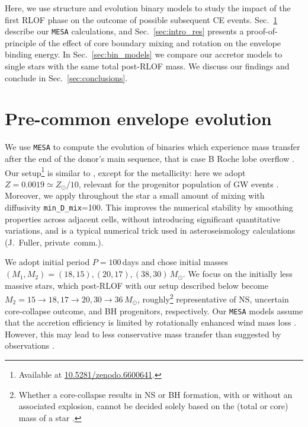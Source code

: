 \documentclass[twocolumn,twocolappendix,trackchanges]{aastex63}
\DeclareRobustCommand{\Secref}[1]{Sec.~\ref{#1}}
\begin{document}
Here, we use structure and evolution binary models to study
the impact of the first RLOF phase on the outcome of possible
subsequent CE events. \Secref{sec:methods} describe our \texttt{MESA}
calculations, and \Secref{sec:intro_res} presents a proof-of-principle
of the effect of core boundary mixing and rotation on the envelope
binding energy. In \Secref{sec:bin_models} we compare our accretor
models to single stars with the same total post-RLOF mass. We discuss
our findings and conclude in
\Secref{sec:conclusions}.

\section{Pre-common envelope evolution}
\label{sec:methods}

We use \texttt{MESA}
\citep[version 15140,][]{paxton:2011, paxton:2013, paxton:2015,
  paxton:2018, paxton:2011} to compute the evolution of binaries which
experience mass transfer after the end of the donor's main sequence,
that is case B Roche lobe overflow \citep[RLOF,][]{kippenhahn:1967}.
Our setup\footnote{Available at \url{10.5281/zenodo.6600641}.} is similar to
\cite{renzo:2021zoph}, except for the
metallicity: here we adopt $Z=0.0019\simeq Z_\odot/10$, relevant for
the progenitor population of GW events \citep[e.g.,][]{vanson:2021}. Moreover, we apply
throughout the star a small amount of mixing with diffusivity
\texttt{min\_D\_mix}=100. This improves the numerical stability by
smoothing properties across adjacent cells, without introducing
significant quantitative variations, and is a typical numerical trick
used in asteroseismology calculations (J.~Fuller, private~comm.).

We adopt initial period $P=100$\,days and chose initial masses
$(M_{1}, M_{2}) = (18, 15), (20, 17), (38, 30)\,M_\odot$. We focus on
the initially less massive stars, which post-RLOF with our setup
described below become
$M_2=15\rightarrow 18, 17\rightarrow 20, 30\rightarrow 36\,M_\odot$, roughly\footnote{Whether a
  core-collapse results in NS or BH formation, with or without an
  associated explosion, cannot be decided solely based on the (total
  or core) mass of a star \citep[e.g.,][]{oconnor:11, farmer:16,
    patton:20, patton:22, zapartas:21b}. } representative of NS,
uncertain core-collapse outcome, and BH progenitors, respectively. Our \texttt{MESA} models
assume that the accretion efficiency is limited by rotationally
enhanced wind mass loss \citep[e.g.,][]{sravan:2019, wang:2020,
  renzo:2021zoph, sen:2022}. However, this may lead to less
conservative mass transfer than suggested by observations
\citep[e.g.,][]{wang:2021a}.
\end{document}

